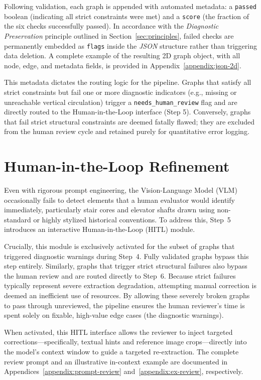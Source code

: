 \documentclass[12pt,a4paper,openright]{report}
\begin{document}
Following validation, each graph is appended with automated metadata: a \texttt{passed} boolean (indicating all strict constraints were met) and a \texttt{score} (the fraction of the six checks successfully passed). In accordance with the \emph{Diagnostic Preservation} principle outlined in Section~\ref{sec:principles}, failed checks are permanently embedded as \texttt{flags} inside the \textit{JSON} structure rather than triggering data deletion. A complete example of the resulting 2D graph object, with all node, edge, and metadata fields, is provided in Appendix~\ref{appendix:json-2d}.

This metadata dictates the routing logic for the pipeline. Graphs that satisfy all strict constraints but fail one or more diagnostic indicators (e.g., missing or unreachable vertical circulation) trigger a \texttt{needs\_human\_review} flag and are directly routed to the Human-in-the-Loop interface (Step 5). Conversely, graphs that fail strict structural constraints are deemed fatally flawed; they are excluded from the human review cycle and retained purely for quantitative error logging.

\section{Human-in-the-Loop Refinement}
\label{sec:human-review}

Even with rigorous prompt engineering, the Vision-Language Model (VLM) occasionally fails to detect elements that a human evaluator would identify immediately, particularly stair cores and elevator shafts drawn using non-standard or highly stylized historical conventions. To address this, Step~5 introduces an interactive Human-in-the-Loop (HITL) module. 

Crucially, this module is exclusively activated for the subset of graphs that triggered diagnostic warnings during Step~4. Fully validated graphs bypass this step entirely. Similarly, graphs that trigger strict structural failures also bypass the human review and are routed directly to Step~6. Because strict failures typically represent severe extraction degradation, attempting manual correction is deemed an inefficient use of resources. By allowing these severely broken graphs to pass through unreviewed, the pipeline ensures the human reviewer's time is spent solely on fixable, high-value edge cases (the diagnostic warnings).

When activated, this HITL interface allows the reviewer to inject targeted corrections---specifically, textual hints and reference image crops---directly into the model's context window to guide a targeted re-extraction. The complete review prompt and an illustrative in-context example are documented in Appendices~\ref{appendix:prompt-review} and~\ref{appendix:ex-review}, respectively.
\end{document}
